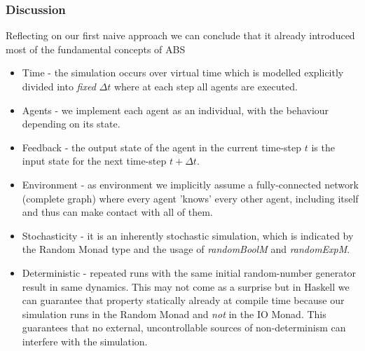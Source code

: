     	
%    	

\subsubsection{Discussion}
Reflecting on our first naive approach we can conclude that it already introduced most of the fundamental concepts of ABS
\begin{itemize}
	\item Time - the simulation occurs over virtual time which is modelled explicitly divided into \textit{fixed} $\Delta t$ where at each step all agents are executed.
	\item Agents - we implement each agent as an individual, with the behaviour depending on its state.
	\item Feedback - the output state of the agent in the current time-step $t$ is the input state for the next time-step $t + \Delta t$.
	\item Environment - as environment we implicitly assume a fully-connected network (complete graph) where every agent 'knows' every other agent, including itself and thus can make contact with all of them.
	\item Stochasticity - it is an inherently stochastic simulation, which is indicated by the Random Monad type and the usage of \textit{randomBoolM} and \textit{randomExpM}.
	\item Deterministic - repeated runs with the same initial random-number generator result in same dynamics. This may not come as a surprise but in Haskell we can guarantee that property statically already at compile time because our simulation runs in the Random Monad and \textit{not} in the IO Monad. This guarantees that no external, uncontrollable sources of non-determinism can interfere with the simulation.
\end{itemize}

